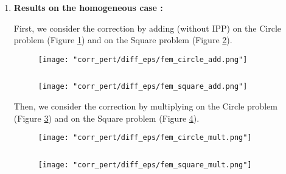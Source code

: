 \begin{enumerate}[label=\textbullet]
	\item \textbf{Results on the homogeneous case :}
	
	First, we consider the correction by adding (without IPP) on the Circle problem (Figure \ref{corr_pert_fem_circle_add}) and on the Square problem (Figure \ref{corr_pert_fem_square_add}).
	
	\begin{minipage}{0.48\linewidth}
		\begin{figure}[H]
			\centering
			\texttt{[image: "corr\_pert/diff\_eps/fem\_circle\_add.png"]}
			\label{corr_pert_fem_circle_add}
		\end{figure} 
	\end{minipage} $\qquad$
	\begin{minipage}{0.48\linewidth}
		\begin{figure}[H]
			\centering
			\texttt{[image: "corr\_pert/diff\_eps/fem\_square\_add.png"]}
			\label{corr_pert_fem_square_add}
		\end{figure} 
	\end{minipage}
	
	Then, we consider the correction by multiplying on the Circle problem (Figure \ref{corr_pert_fem_circle_mult}) and on the Square problem (Figure \ref{corr_pert_fem_square_mult}).
	
	\begin{minipage}{0.48\linewidth}
		\begin{figure}[H]
			\centering
			\texttt{[image: "corr\_pert/diff\_eps/fem\_circle\_mult.png"]}
			\label{corr_pert_fem_circle_mult}
		\end{figure} 
	\end{minipage} $\qquad$
	\begin{minipage}{0.48\linewidth}
		\begin{figure}[H]
			\centering
			\texttt{[image: "corr\_pert/diff\_eps/fem\_square\_mult.png"]}
			\label{corr_pert_fem_square_mult}
		\end{figure} 
	\end{minipage}
	

\end{enumerate}
